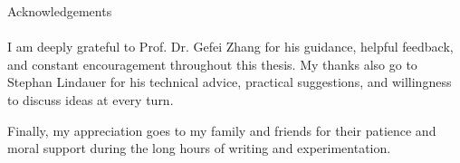 
\thispagestyle{empty}
\vspace*{2.2cm}
\noindent
{\Huge Acknowledgements}\\
\vspace*{1.6cm} \\


I am deeply grateful to Prof. Dr. Gefei Zhang for his guidance, helpful feedback, and constant encouragement throughout this thesis. My thanks also go to Stephan Lindauer for his technical advice, practical suggestions, and willingness to discuss ideas at every turn.

Finally, my appreciation goes to my family and friends for their patience and moral support during the long hours of writing and experimentation.
